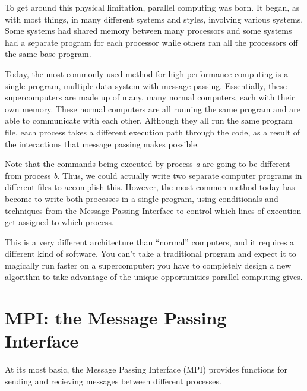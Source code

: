     To get around this physical limitation, parallel computing was born. It began, as with most things, in many different systems and styles, involving various systems. Some systems had shared memory between many processors and some systems had a separate program for each processor while others ran all the processors off the same base program.

    Today, the most commonly used method for high performance computing is a single-program, multiple-data system with message passing. Essentially, these supercomputers are made up of many, many normal computers, each with their own memory. These normal computers are all running the same program and are able to communicate with each other. Although they all run the same program file, each process takes a different execution path through the code, as a result of the interactions that message passing makes possible.

    Note that the commands being executed by process \emph{a} are going to be different from process \emph{b}. Thus, we could actually write two separate computer programs in different files to accomplish this. However, the most common method today has become to write both processes in a single program, using conditionals and techniques from the Message Passing Interface to control which lines of execution get assigned to which process.

    This is a very different architecture than ``normal'' computers, and it requires a different kind of software. You can't take a traditional program and expect it to magically run faster on a supercomputer; you have to completely design a new algorithm to take advantage of the unique opportunities parallel computing gives.

  \section*{MPI: the Message Passing Interface}
    At its most basic, the Message Passing Interface (MPI) provides functions for sending and recieving messages between different processes.

